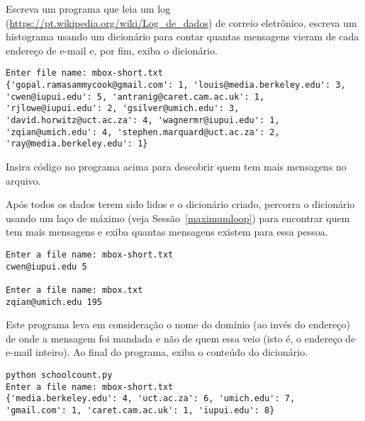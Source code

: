 \begin{ex}
Escreva um programa que leia um log (\url{https://pt.wikipedia.org/wiki/Log_de_dados}) de correio eletrônico, escreva um histograma usando um dicionário para contar quantas mensagens vieram de cada endereço de e-mail e, por fim, exiba o dicionário.

\beforeverb
\begin{verbatim}
Enter file name: mbox-short.txt
{'gopal.ramasammycook@gmail.com': 1, 'louis@media.berkeley.edu': 3,
'cwen@iupui.edu': 5, 'antranig@caret.cam.ac.uk': 1,
'rjlowe@iupui.edu': 2, 'gsilver@umich.edu': 3,
'david.horwitz@uct.ac.za': 4, 'wagnermr@iupui.edu': 1,
'zqian@umich.edu': 4, 'stephen.marquard@uct.ac.za': 2,
'ray@media.berkeley.edu': 1}
\end{verbatim}
\afterverb
\end{ex}

\begin{ex}
Insira código no programa acima para descobrir quem tem mais mensagens no arquivo.

Após todos os dados terem sido lidos e o dicionário criado, percorra o dicionário usando um laço de máximo (veja Sessão~\ref{maximumloop}) para encontrar quem tem mais mensagens e exiba quantas mensagens existem para essa pessoa.

\beforeverb
\begin{verbatim}
Enter a file name: mbox-short.txt
cwen@iupui.edu 5

Enter a file name: mbox.txt
zqian@umich.edu 195
\end{verbatim}
\afterverb
\end{ex}

\begin{ex}
Este programa leva em consideração o nome do domínio (ao invés do endereço) de onde a mensagem foi mandada e não de quem essa veio (isto é, o endereço de e-mail inteiro). Ao final do programa, exiba o conteúdo do dicionário.

\beforeverb
\begin{verbatim}
python schoolcount.py
Enter a file name: mbox-short.txt
{'media.berkeley.edu': 4, 'uct.ac.za': 6, 'umich.edu': 7,
'gmail.com': 1, 'caret.cam.ac.uk': 1, 'iupui.edu': 8}
\end{verbatim}
\afterverb
\end{ex}
